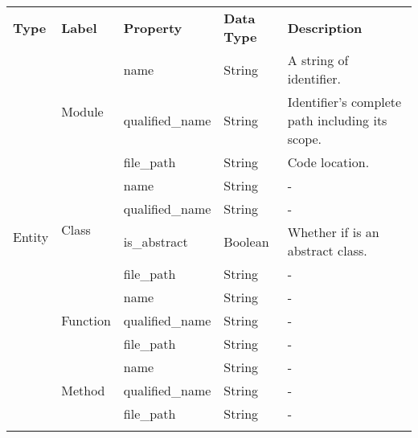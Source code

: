 \begin{tabular}{p{1.6cm}|p{1.7cm}|p{2cm}|p{3.3cm}|p{7.5cm}}
\hline
\textbf{Type} & \textbf{Label} & \textbf{Property} & \textbf{Data Type} & \textbf{Description} \\
\cline{1-1}\cline{2-2}\cline{3-3}\cline{4-4}\cline{5-5}
\multirow{13}{*}{Entity} & \multirow{3}{*}{Module} & name & String & A string of identifier. \\
\cline{3-3}\cline{4-4}\cline{5-5}
 &  & qualified\_name & String & Identifier's complete path including its scope. \\
\cline{3-3}\cline{4-4}\cline{5-5}
 &  & file\_path & String & Code location. \\
\cline{2-2}\cline{3-3}\cline{4-4}\cline{5-5}
 & \multirow{4}{*}{Class} & name & String & - \\
\cline{3-3}\cline{4-4}\cline{5-5}
 &  & qualified\_name & String & - \\
\cline{3-3}\cline{4-4}\cline{5-5}
 &  & is\_abstract & Boolean & Whether if is an abstract class. \\
\cline{3-3}\cline{4-4}\cline{5-5}
 &  & file\_path & String & - \\
\cline{2-2}\cline{3-3}\cline{4-4}\cline{5-5}
 & \multirow{3}{*}{Function} & name & String & - \\
\cline{3-3}\cline{4-4}\cline{5-5}
 &  & qualified\_name & String & - \\
\cline{3-3}\cline{4-4}\cline{5-5}
 &  & file\_path & String & - \\
\cline{2-2}\cline{3-3}\cline{4-4}\cline{5-5}
 & \multirow{3}{*}{Method} & name & String & - \\
\cline{3-3}\cline{4-4}\cline{5-5}
 &  & qualified\_name & String & - \\
\cline{3-3}\cline{4-4}\cline{5-5}
 &  & file\_path & String & - \\
\cline{1-1}\cline{2-2}\cline{3-3}\cline{4-4}\cline{5-5}
 &  &  &  &  \\
\cline{1-1}\cline{2-2}\cline{3-3}\cline{4-4}\cline{5-5}
\hline
\end{tabular}

